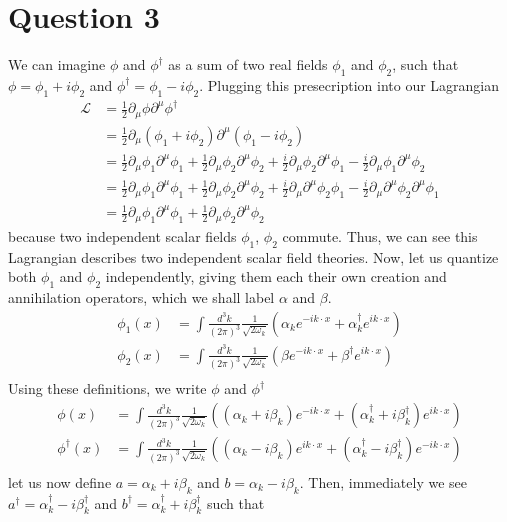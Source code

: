\documentclass[12pt]{article}
\newcommand{\delmu}{\partial_{\mu}}
\newcommand{\delMu}{\partial^{\mu}}
\begin{document}
\section*{Question 3}
We can imagine $\phi$ and $\phi^{\dagger}$ as a sum of two real fields $\phi_1$ 
and $\phi_2$, such that $\phi = \phi_1 + i\phi_2$ and $\phi^{\dagger} = \phi_1 -
i\phi_2$. Plugging this presecription into our Lagrangian
\begin{align*}
   \mathcal{L} &= \frac{1}{2}\delmu\phi\delMu\phi^{\dagger} \\ 
               &= \frac{1}{2}\delmu(\phi_1 + i \phi_2)\delMu(\phi_1 - i\phi_2) \\
               &= \frac{1}{2}\delmu\phi_1\delMu\phi_1
               + \frac{1}{2}\delmu\phi_2\delMu\phi_2
               + \frac{i}{2}\delmu\phi_2\delMu\phi_1
               - \frac{i}{2}\delmu\phi_1\delMu\phi_2 \\
               &= \frac{1}{2}\delmu\phi_1\delMu\phi_1
               + \frac{1}{2}\delmu\phi_2\delMu\phi_2
               + \frac{i}{2}\delmu\delMu\phi_2\phi_1
               - \frac{i}{2}\delmu\delMu\phi_2\delMu\phi_1 \\
               &= \frac{1}{2}\delmu\phi_1\delMu\phi_1
               + \frac{1}{2}\delmu\phi_2\delMu\phi_2
\end{align*}
because two independent scalar fields $\phi_1$, $\phi_2$ commute. Thus, we can
see this Lagrangian describes two independent scalar field theories. Now,
let us quantize both $\phi_1$ and $\phi_2$ independently, giving them each
their own creation and annihilation operators, which we shall label $\alpha$ 
and $\beta$.
\begin{align*}
   \phi_1(x) &= \int \frac{d^3k}{(2\pi)^3} \frac{1}{\sqrt{2\omega_k}} (\alpha_k
   e^{-ik\cdot x} + \alpha_k^{\dagger}e^{ik\cdot x}) \\
   \phi_2(x) &= \int \frac{d^3k}{(2\pi)^3} \frac{1}{\sqrt{2\omega_k}} (\beta
   e^{-ik\cdot x} + \beta^{\dagger}e^{ik\cdot x}) \\
\end{align*}
Using these definitions, we write $\phi$ and $\phi^{\dagger}$
\begin{align*}
   \phi(x) &= \int \frac{d^3k}{(2\pi)^3} \frac{1}{\sqrt{2\omega_k}} \left(
   (\alpha_k + i\beta_k)e^{-ik\cdot x} + (\alpha^{\dagger}_k +
   i\beta^{\dagger}_k)e^{ik\cdot x} \right) \\
   \phi^{\dagger}(x) &= \int \frac{d^3k}{(2\pi)^3} \frac{1}{\sqrt{2\omega_k}}
   \left( (\alpha_k - i\beta_k)e^{ik\cdot x} + (\alpha^{\dagger}_k -
   i\beta^{\dagger}_k)e^{-ik\cdot x} \right) \\
\end{align*}
let us now define $a = \alpha_k + i\beta_k$ and $b = \alpha_k - i\beta_k$. Then,
immediately we see $a^{\dagger} = \alpha_k^{\dagger} - i\beta_k^{\dagger}$ and 
$b^{\dagger} = \alpha_k^{\dagger} + i \beta_k^{\dagger}$ such that
\end{document}

